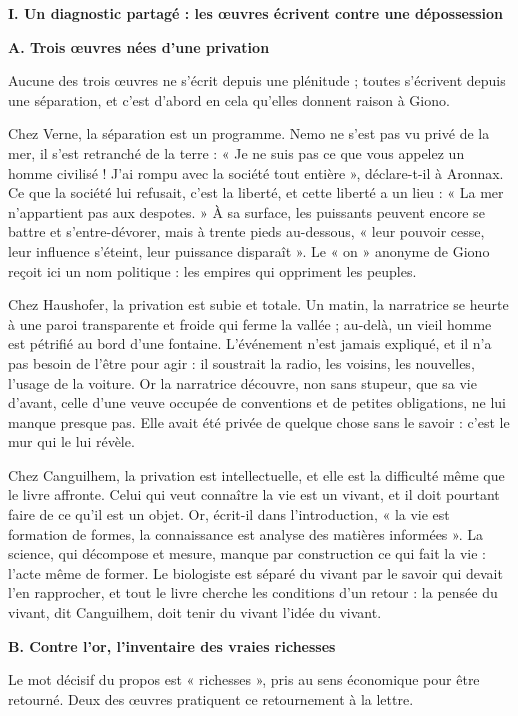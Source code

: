 \documentclass[11pt,a4paper]{article}
\begin{document}
\textbf{I. Un diagnostic partagé : les œuvres écrivent contre une dépossession}

\textbf{A. Trois œuvres nées d'une privation}

Aucune des trois œuvres ne s'écrit depuis une plénitude ; toutes s'écrivent depuis une séparation, et c'est d'abord en cela qu'elles donnent raison à Giono.

Chez Verne, la séparation est un programme. Nemo ne s'est pas vu privé de la mer, il s'est retranché de la terre : « Je ne suis pas ce que vous appelez un homme civilisé ! J'ai rompu avec la société tout entière », déclare-t-il à Aronnax. Ce que la société lui refusait, c'est la liberté, et cette liberté a un lieu : « La mer n'appartient pas aux despotes. » À sa surface, les puissants peuvent encore se battre et s'entre-dévorer, mais à trente pieds au-dessous, « leur pouvoir cesse, leur influence s'éteint, leur puissance disparaît ». Le « on » anonyme de Giono reçoit ici un nom politique : les empires qui oppriment les peuples.

Chez Haushofer, la privation est subie et totale. Un matin, la narratrice se heurte à une paroi transparente et froide qui ferme la vallée ; au-delà, un vieil homme est pétrifié au bord d'une fontaine. L'événement n'est jamais expliqué, et il n'a pas besoin de l'être pour agir : il soustrait la radio, les voisins, les nouvelles, l'usage de la voiture. Or la narratrice découvre, non sans stupeur, que sa vie d'avant, celle d'une veuve occupée de conventions et de petites obligations, ne lui manque presque pas. Elle avait été privée de quelque chose sans le savoir : c'est le mur qui le lui révèle.

Chez Canguilhem, la privation est intellectuelle, et elle est la difficulté même que le livre affronte. Celui qui veut connaître la vie est un vivant, et il doit pourtant faire de ce qu'il est un objet. Or, écrit-il dans l'introduction, « la vie est formation de formes, la connaissance est analyse des matières informées ». La science, qui décompose et mesure, manque par construction ce qui fait la vie : l'acte même de former. Le biologiste est séparé du vivant par le savoir qui devait l'en rapprocher, et tout le livre cherche les conditions d'un retour : la pensée du vivant, dit Canguilhem, doit tenir du vivant l'idée du vivant.

\textbf{B. Contre l'or, l'inventaire des vraies richesses}

Le mot décisif du propos est « richesses », pris au sens économique pour être retourné. Deux des œuvres pratiquent ce retournement à la lettre.
\end{document}
